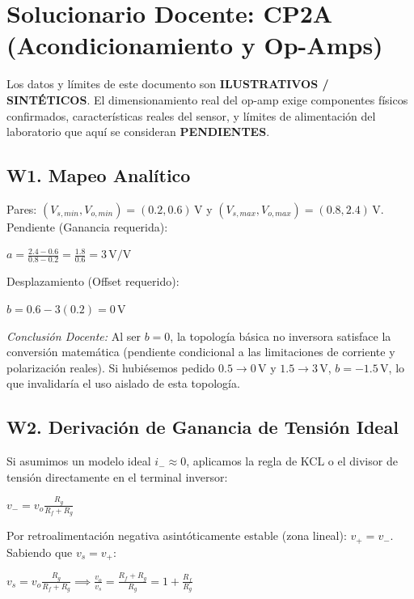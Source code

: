 \documentclass[11pt, a4paper]{article}
\begin{document}
\section*{Solucionario Docente: CP2A (Acondicionamiento y Op-Amps)}

\begin{tcolorbox}[colback=ucbblue!5, colframe=ucbblue, title=\textbf{Nota Crítica de Fallback (Restricción Hardware)}]
Los datos y límites de este documento son \textbf{ILUSTRATIVOS / SINTÉTICOS}. El dimensionamiento real del op-amp exige componentes físicos confirmados, características reales del sensor, y límites de alimentación del laboratorio que aquí se consideran \textbf{PENDIENTES}.
\end{tcolorbox}

\subsection*{W1. Mapeo Analítico}
Pares: $(V_{s,min}, V_{o,min}) = (0.2, 0.6)\,\text{V}$ y $(V_{s,max}, V_{o,max}) = (0.8, 2.4)\,\text{V}$. \\
Pendiente (Ganancia requerida):
{\centering $\displaystyle a = \frac{2.4 - 0.6}{0.8 - 0.2} = \frac{1.8}{0.6} = 3\,\text{V/V}$ \par}
Desplazamiento (Offset requerido):
{\centering $\displaystyle b = 0.6 - 3(0.2) = 0\,\text{V}$ \par}
\textit{Conclusión Docente:} Al ser $b=0$, la topología básica no inversora satisface la conversión matemática (pendiente condicional a las limitaciones de corriente y polarización reales). Si hubiésemos pedido $0.5 \to 0\,\text{V}$ y $1.5 \to 3\,\text{V}$, $b = -1.5\,\text{V}$, lo que invalidaría el uso aislado de esta topología.

\subsection*{W2. Derivación de Ganancia de Tensión Ideal}
Si asumimos un modelo ideal $i_- \approx 0$, aplicamos la regla de KCL o el divisor de tensión directamente en el terminal inversor:
{\centering $\displaystyle v_- = v_o \frac{R_g}{R_f + R_g}$ \par}
Por retroalimentación negativa asintóticamente estable (zona lineal): $v_+ = v_-$. \\
Sabiendo que $v_s = v_+$:
{\centering $\displaystyle v_s = v_o \frac{R_g}{R_f + R_g} \implies \frac{v_o}{v_s} = \frac{R_f + R_g}{R_g} = 1 + \frac{R_f}{R_g}$ \par}
\end{document}
